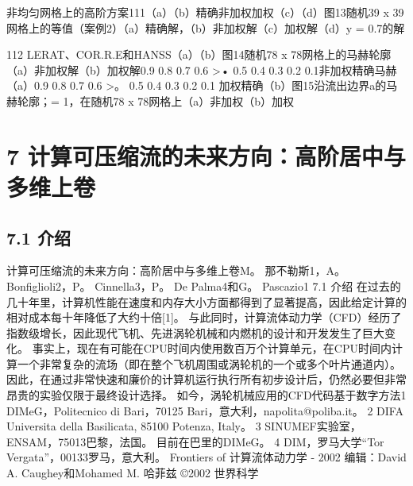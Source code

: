 \documentclass[UTF8,11pt,a4paper,openany,fontset=fandol]{ctexbook}
\begin{document}
非均匀网格上的高阶方案111（a）（b）精确非加权加权（c）（d）图13随机39 x 39网格上的等值（案例2）（a）精确解，（b）非加权解（c）加权解（d）y = 0.7的解

112 LERAT、COR.R.E和HANSS（a）（b）图14随机78 x 78网格上的马赫轮廓（a）非加权解（b）加权解0.9 0.8 0.7 0.6 >• 0.5 0.4 0.3 0.2 0.1非加权精确马赫（a）0.9 0.8 0.7 0.6 >。 0.5 0.4 0.3 0.2 0.1 加权精确（b）图15沿流出边界a的马赫轮廓；= 1，在随机78 x 78网格上（a）非加权（b）加权

\clearpage
\chapter{7 计算可压缩流的未来方向：高阶居中与多维上卷}
\section{7.1 介绍}
计算可压缩流的未来方向：高阶居中与多维上卷M。 那不勒斯1，A。 Bonfiglioli2，P。 Cinnella3，P。 De Palma4和G。 Pascazio1 7.1 介绍 在过去的几十年里，计算机性能在速度和内存大小方面都得到了显著提高，因此给定计算的相对成本每十年降低了大约十倍[1]。 与此同时，计算流体动力学（CFD）经历了指数级增长，因此现代飞机、先进涡轮机械和内燃机的设计和开发发生了巨大变化。 事实上，现在有可能在CPU时间内使用数百万个计算单元，在CPU时间内计算一个非常复杂的流场（即在整个飞机周围或涡轮机的一个或多个叶片通道内）。 因此，在通过非常快速和廉价的计算机运行执行所有初步设计后，仍然必要但非常昂贵的实验仅限于最终设计选择。 如今，涡轮机械应用的CFD代码基于数字方法1 DIMeG，Politecnico di Bari，70125 Bari，意大利，napolita@poliba.it。 2 DIFA Universita della Basilicata, 85100 Potenza, Italy。 3 SINUMEF实验室，ENSAM，75013巴黎，法国。 目前在巴里的DIMeG。 4 DIM，罗马大学“Tor Vergata”，00133罗马，意大利。 Frontiers of 计算流体动力学 - 2002 编辑：David A. Caughey和Mohamed M. 哈菲兹 ©2002 世界科学
\end{document}
